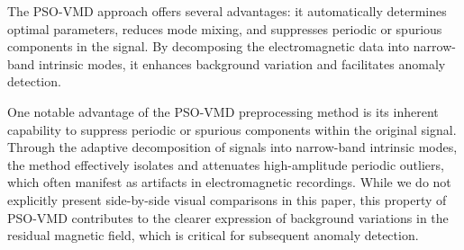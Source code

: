 \documentclass[3p,authoryear,preprint,12pt]{elsarticle}
\begin{document}
%
{The PSO-VMD approach offers several advantages: it automatically determines optimal parameters, reduces mode mixing, and suppresses periodic or spurious components in the signal. By decomposing the electromagnetic data into narrow-band intrinsic modes, it enhances background variation and facilitates anomaly detection.
}

{One notable advantage of the PSO-VMD preprocessing method is its inherent capability to suppress periodic or spurious components within the original signal. Through the adaptive decomposition of signals into narrow-band intrinsic modes, the method effectively isolates and attenuates high-amplitude periodic outliers, which often manifest as artifacts in electromagnetic recordings. While we do not explicitly present side-by-side visual comparisons in this paper, this property of PSO-VMD contributes to the clearer expression of background variations in the residual magnetic field, which is critical for subsequent anomaly detection.}
\end{document}
